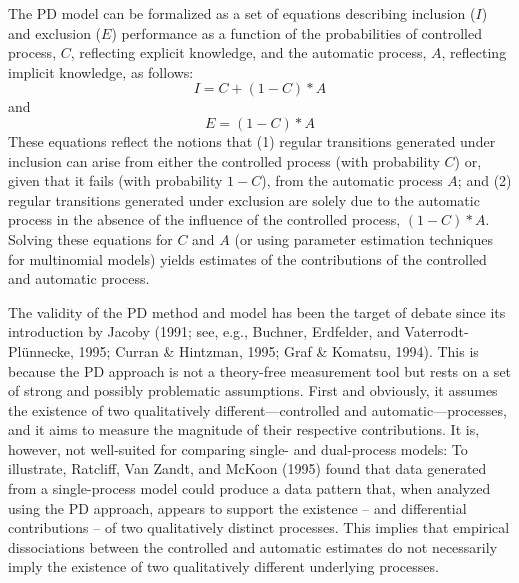 \documentclass[jou]{apa6}
\theoremstyle{definition}
\theoremstyle{definition}
\theoremstyle{definition}
\theoremstyle{remark}
\begin{document}
The PD model can be formalized as a set of equations describing
inclusion (\(I\)) and exclusion (\(E\)) performance as a function of the
probabilities of controlled process, \(C\), reflecting explicit
knowledge, and the automatic process, \(A\), reflecting implicit
knowledge, as follows: \[I=C+(1-C)*A\] and \[E=(1-C)*A\] These equations
reflect the notions that (1) regular transitions generated under
inclusion can arise from either the controlled process (with probability
\(C\)) or, given that it fails (with probability \(1-C\)), from the
automatic process \(A\); and (2) regular transitions generated under
exclusion are solely due to the automatic process in the absence of the
influence of the controlled process, \((1-C)*A\). Solving these
equations for \(C\) and \(A\) (or using parameter estimation techniques
for multinomial models) yields estimates of the contributions of the
controlled and automatic process.

The validity of the PD method and model has been the target of debate
since its introduction by Jacoby (1991; see, e.g., Buchner, Erdfelder,
and Vaterrodt-Plünnecke, 1995; Curran \& Hintzman, 1995; Graf \&
Komatsu, 1994). This is because the PD approach is not a theory-free
measurement tool but rests on a set of strong and possibly problematic
assumptions. First and obviously, it assumes the existence of two
qualitatively different---controlled and automatic---processes, and it
aims to measure the magnitude of their respective contributions. It is,
however, not well-suited for comparing single- and dual-process models:
To illustrate, Ratcliff, Van Zandt, and McKoon (1995) found that data
generated from a single-process model could produce a data pattern that,
when analyzed using the PD approach, appears to support the existence --
and differential contributions -- of two qualitatively distinct
processes. This implies that empirical dissociations between the
controlled and automatic estimates do not necessarily imply the
existence of two qualitatively different underlying processes.
\end{document}
